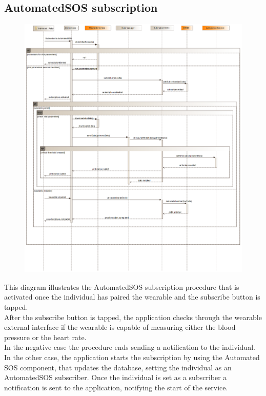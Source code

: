 \subsection{AutomatedSOS subscription}
\begin{figure}[H]
\centering
\includegraphics[width=\linewidth]{resources/uml/sequence/AutomatedSOS.png}
\end{figure}
This diagram illustrates the AutomatedSOS subscription procedure that is activated once the individual has paired the wearable and the subscribe button is tapped.\\
After the subscribe button is tapped, the application checks through the wearable external interface if the wearable is capable of measuring either the blood pressure or the heart rate.\\
In the negative case the procedure ends sending a notification to the individual.
In the other case, the application starts the subscription by using the Automated SOS component, that updates the database, setting the individual as an AutomatedSOS subscriber. Once the individual is set as a subscriber a notification is sent to the application, notifying the start of the service.\\

